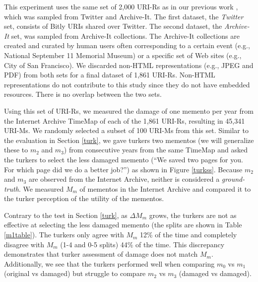 This experiment uses the same set of 2,000 URI-Rs as in our previous work \cite{ijdl}, which was sampled from Twitter and Archive-It. The first dataset, the \emph{Twitter} set, consists of Bitly URIs shared over Twitter. The second dataset, the \emph{Archive-It} set, was sampled from Archive-It collections. The Archive-It collections are created and curated by human users often corresponding to a certain event (e.g., National September 11 Memorial Museum) or a specific set of Web sites (e.g., City of San Francisco). We discarded non-HTML representations (e.g., JPEG and PDF) from both sets for a final dataset of 1,861 URI-Rs. Non-HTML representations do not contribute to this study since they do not have embedded resources. There is no overlap between the two sets.

Using this set of URI-Rs, we measured the damage of one memento per year from the Internet Archive TimeMap of each of the 1,861 URI-Rs, resulting in 45,341 URI-Ms. We randomly selected a subset of 100 URI-Ms from this set. Similar to the evaluation in Section \ref{turk}, we gave turkers two mementos (we will generalize these to $m_2$ and $m_3$) from consecutive years from the same TimeMap and asked the turkers to select the less damaged memento (``We saved two pages for you. For which page did we do a better job?'') as shown in Figure \ref{turkss}. Because $m_2$ and $m_3$ are observed from the Internet Archive, neither is considered a \emph{ground-truth}. We measured $M_m$ of mementos in the Internet Archive and compared it to the turker perception of the utility of the mementos. 

Contrary to the test in Section \ref{turk}, as {$\Delta M_m$} grows, the turkers are not as effective at selecting the less damaged memento (the splits are shown in Table \ref{m1table}). The turkers only agree with $M_m$ 12\% of the time and completely disagree with $M_m$ (1-4 and 0-5 splits) 44\% of the time. This discrepancy demonstrates that turker assessment of damage does not match $M_m$. Additionally, we see that the turkers performed well when comparing $m_0$ vs $m_1$ (original vs damaged) but struggle to compare $m_2$ vs $m_3$ (damaged vs damaged).


